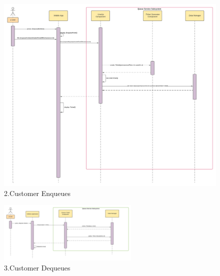 \begin{figure}[h!]
    \centering
    \includegraphics[width=1\textwidth]{Images/runtimeViewDD/RunTimeViewUserEnqueue.png}
    \caption{\label{fig:RunTimeViewUserEnqueue}{2.Customer Enqueues}}
\end{figure}

\begin{figure}[h!]
    \centering
    \includegraphics[width=0.6\textwidth]{Images/runtimeViewDD/RunTimeViewDequeue.png}
    \caption{\label{fig:RunTimeViewDequeue}{3.Customer Dequeues}}
\end{figure}


